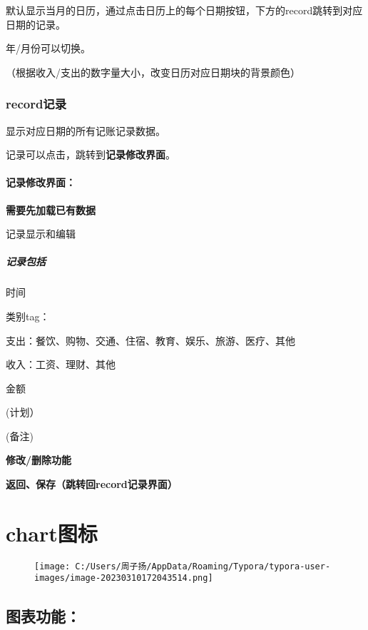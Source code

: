 \documentclass[
]{article}
\begin{document}
默认显示当月的日历，通过点击日历上的每个日期按钮，下方的record跳转到对应日期的记录。

年/月份可以切换。

（根据收入/支出的数字量大小，改变日历对应日期块的背景颜色）

\hypertarget{recordux8bb0ux5f55}{%
\subsubsection{record记录}\label{recordux8bb0ux5f55}}

显示对应日期的所有记账记录数据。

记录可以点击，跳转到\textbf{记录修改界面}。

\hypertarget{ux8bb0ux5f55ux4feeux6539ux754cux9762}{%
\paragraph{记录修改界面：}\label{ux8bb0ux5f55ux4feeux6539ux754cux9762}}

\textbf{需要先加载已有数据}

记录显示和编辑

\hypertarget{ux8bb0ux5f55ux5305ux62ec-1}{%
\subparagraph{记录包括}\label{ux8bb0ux5f55ux5305ux62ec-1}}

时间

类别tag：

支出：餐饮、购物、交通、住宿、教育、娱乐、旅游、医疗、其他

收入：工资、理财、其他

金额

(计划）

(备注)

\textbf{修改/删除功能}

\textbf{返回、保存（跳转回record记录界面）}

\hypertarget{chartux56feux6807}{%
\section{chart图标}\label{chartux56feux6807}}

\begin{figure}
\centering
\texttt{[image: C:/Users/周子扬/AppData/Roaming/Typora/typora-user-images/image-20230310172043514.png]}
\caption{}
\end{figure}

\hypertarget{ux56feux8868ux529fux80fd}{%
\subsection{图表功能：}\label{ux56feux8868ux529fux80fd}}
\end{document}
